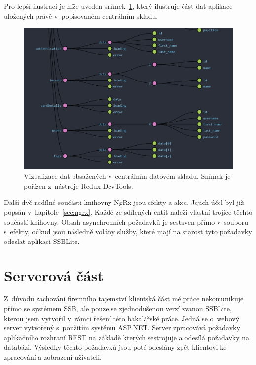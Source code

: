 Pro lepší ilustraci je níže uveden snímek~\ref{img:ngrx-devtools}, který ilustruje část dat aplikace uložených právě v~popisovaném centrálním skladu.

\begin{figure}[H]
	\centering
	\label{img:ngrx-devtools}
	\includegraphics[width=\textwidth]{obrazky-figures/ngrx-chart.png}
	\caption[Vizualizace dat obsažených v~centrálním datovém skladu. Snímek je pořízen z~nástroje Redux DevTools.]{Vizualizace dat obsažených v~centrálním datovém skladu. Snímek je pořízen z~nástroje Redux DevTools\protect\footnotemark.}
\end{figure}

Další dvě nedílné součásti knihovny NgRx jsou efekty a akce. Jejich účel byl již popsán v~kapitole~\ref{sec:ngrx}. Každé ze sdílených entit naleží vlastní trojice těchto součástí knihovny. Obsah asynchronních požadavků je sestaven přímo v~souboru s~efekty, odkud jsou následně volány služby, které mají na starost tyto požadavky odeslat aplikaci SSBLite.



\section{Serverová část}
Z~důvodu zachování firemního tajemství klientská část mé práce nekomunikuje přímo se systémem SSB, ale pouze se zjednodušenou verzí zvanou SSBLite, kterou jsem vytvořil v~rámci řešení této bakalářské práce. Jedná se o~webový server vytvořený s~použitím systému ASP.NET. Server zpracovává požadavky aplikačního rozhraní REST na základě kterých sestrojuje a odesílá požadavky na databázi. Výsledky těchto požadavků jsou poté odeslány zpět klientovi ke zpracování a zobrazení uživateli.

